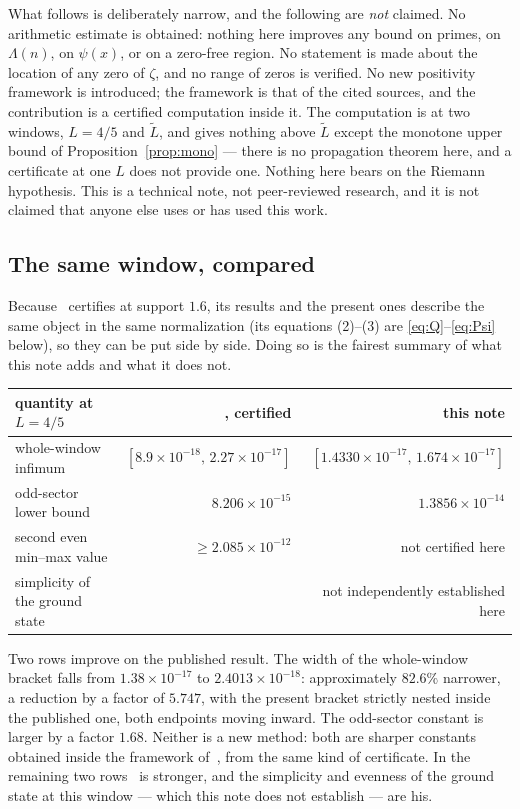 \documentclass[11pt,a4paper]{article}
\theoremstyle{definition}
\theoremstyle{remark}
\begin{document}
What follows is deliberately narrow, and the following are \emph{not} claimed.
No arithmetic estimate is obtained: nothing here improves any bound on primes,
on $\Lambda(n)$, on $\psi(x)$, or on a zero-free region. No statement is made
about the location of any zero of $\zeta$, and no range of zeros is verified.
No new positivity framework is introduced; the framework is that of the cited
sources, and the contribution is a certified computation inside it. The
computation is at two windows, $L = 4/5$ and $\widetilde L$, and gives nothing
above $\widetilde L$ except the monotone upper bound of
Proposition~\ref{prop:mono}
--- there is no propagation theorem here, and a certificate at one $L$ does not
provide one. Nothing here bears on the Riemann hypothesis. This is a technical
note, not peer-reviewed research, and it is not claimed that anyone else uses or
has used this work.

\subsection{The same window, compared}
\label{sec:compared}

Because~\cite{Zhu} certifies at support $1.6$, its results and the present ones
describe the same object in the same normalization (its equations (2)--(3) are
\eqref{eq:Q}--\eqref{eq:Psi} below), so they can be put side by side. Doing so is
the fairest summary of what this note adds and what it does not.

\begin{center}
\begin{tabular}{lrr}
\toprule
quantity at $L = 4/5$ & \cite{Zhu}, certified & this note \\
\midrule
whole-window infimum
  & $[8.9\times10^{-18},\, 2.27\times10^{-17}]$
  & $[1.4330\times10^{-17},\, 1.674\times10^{-17}]$ \\
odd-sector lower bound
  & $8.206\times10^{-15}$
  & $1.3856\times10^{-14}$ \\
second even min--max value
  & $\ge 2.085\times10^{-12}$
  & not certified here \\
simplicity of the ground state
  & \cite[Thm.~6.2]{Zhu}
  & not independently established here \\
\bottomrule
\end{tabular}
\end{center}

Two rows improve on the published result. The width of the whole-window bracket
falls from $1.38\times10^{-17}$ to $2.4013\times10^{-18}$: approximately
$82.6\%$ narrower, a reduction by a factor of $5.747$, with the present bracket
strictly nested inside the published one, both endpoints moving inward. The
odd-sector constant is larger by a factor $1.68$. Neither is a new method: both
are sharper constants obtained inside the framework of~\cite{Zhu}, from the same
kind of certificate. In the remaining two rows~\cite{Zhu} is stronger, and the
simplicity and evenness of the ground state at this window --- which this note
does not establish --- are his.
\end{document}
